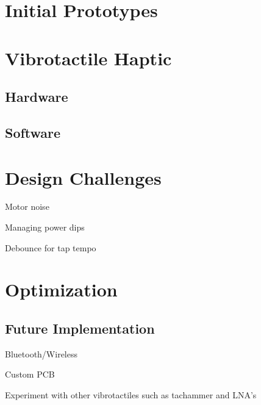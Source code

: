 \cite{Neely}

\section{Initial Prototypes}

\section{Vibrotactile Haptic}

\subsection{Hardware}


\subsection{Software}



\section{Design Challenges}

Motor noise

Managing power dips



Debounce for tap tempo

\section{Optimization}

\subsection{Future Implementation}

Bluetooth/Wireless

Custom PCB

Experiment with other vibrotactiles such as tachammer and LNA's
